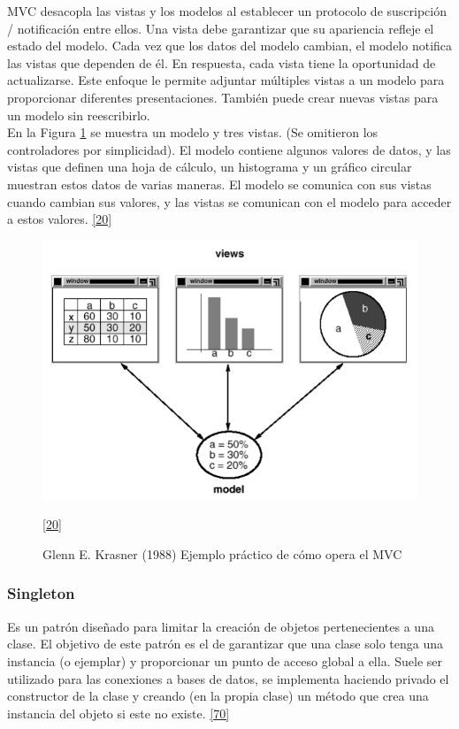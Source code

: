 \newpage

MVC desacopla las vistas y los modelos al establecer un protocolo de suscripción / notificación entre ellos. Una vista debe garantizar que su apariencia refleje el estado del modelo. Cada vez que los datos del modelo cambian, el modelo notifica las vistas que dependen de él. En respuesta, cada vista tiene la oportunidad de actualizarse. Este enfoque le permite adjuntar múltiples vistas a un modelo para proporcionar diferentes presentaciones. También puede crear nuevas vistas para un modelo sin reescribirlo.\\

En la Figura \ref{fig:mvc2} se muestra un modelo y tres vistas. (Se omitieron los controladores por simplicidad). El modelo contiene algunos valores de datos, y las vistas que definen una hoja de cálculo, un histograma y un gráfico circular muestran estos datos de varias maneras. El modelo se comunica con sus vistas cuando cambian sus valores, y las vistas se comunican con el modelo para acceder a estos valores. \hyperlink{b20}{[20]} 

\begin{figure}[H]
	\begin{center}
		\includegraphics[width=.85\textwidth]{images/marcoteorico/mvc2}
		\caption{Glenn E. Krasner (1988) Ejemplo práctico de cómo opera el MVC}
		\hyperlink{b20}{[20]} 
		\label{fig:mvc2}
	\end{center}
\end{figure}

\newpage

\subsubsection{Singleton}
Es un patrón diseñado para limitar la creación de objetos pertenecientes a una clase. El objetivo de este patrón es el de garantizar que una clase solo tenga una instancia (o ejemplar) y proporcionar un punto de acceso global a ella. Suele ser utilizado para las conexiones a bases de datos, se implementa haciendo privado el constructor de la clase y creando (en la propia clase) un método que crea una instancia del objeto si este no existe. \hyperlink{b70}{[70]}\\

